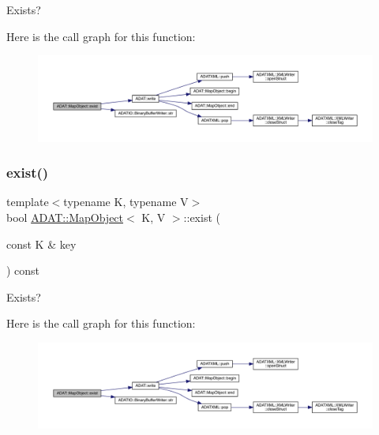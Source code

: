 Exists? 

Here is the call graph for this function\+:
\nopagebreak
\begin{figure}[H]
\begin{center}
\leavevmode
\includegraphics[width=350pt]{da/d29/classADAT_1_1MapObject_a1d22f979e34bda97c3dc89d5fc937d3b_cgraph}
\end{center}
\end{figure}
\mbox{\label{classADAT_1_1MapObject_a1d22f979e34bda97c3dc89d5fc937d3b}} 
\subsubsection{\texorpdfstring{exist()}{exist()}\hspace{0.1cm}{\footnotesize\ttfamily [3/3]}}
{\footnotesize\ttfamily template$<$typename K, typename V$>$ \\
bool \mbox{\hyperlink{classADAT_1_1MapObject}{A\+D\+A\+T\+::\+Map\+Object}}$<$ K, V $>$\+::exist (\begin{DoxyParamCaption}\item[{const K \&}]{key }\end{DoxyParamCaption}) const\hspace{0.3cm}{\ttfamily [inline]}}



Exists? 

Here is the call graph for this function\+:
\nopagebreak
\begin{figure}[H]
\begin{center}
\leavevmode
\includegraphics[width=350pt]{da/d29/classADAT_1_1MapObject_a1d22f979e34bda97c3dc89d5fc937d3b_cgraph}
\end{center}
\end{figure}
\mbox{\label{classADAT_1_1MapObject_a5389738841dca1228aefe6935c464a78}} 
